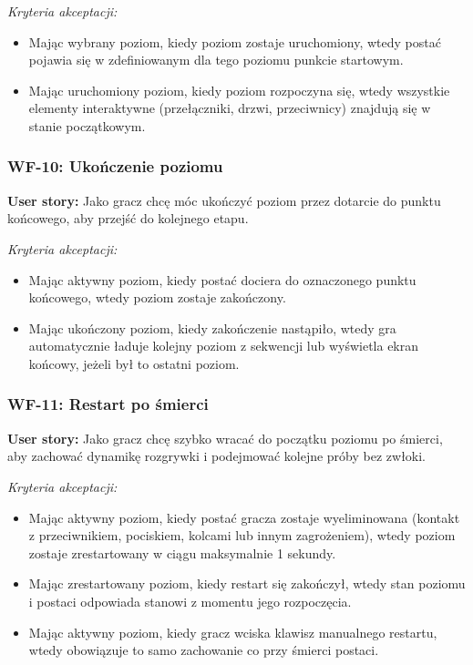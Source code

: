 \textit{Kryteria akceptacji:}
\begin{itemize}[noitemsep]
    \item Mając wybrany poziom, kiedy poziom zostaje uruchomiony, wtedy postać pojawia się w zdefiniowanym dla tego poziomu punkcie startowym.
    \item Mając uruchomiony poziom, kiedy poziom rozpoczyna się, wtedy wszystkie elementy interaktywne (przełączniki, drzwi, przeciwnicy) znajdują się w stanie początkowym.
\end{itemize}

\subsubsection*{WF-10: Ukończenie poziomu}
\textbf{User story:} Jako gracz chcę móc ukończyć poziom przez dotarcie do punktu końcowego, aby przejść do kolejnego etapu.

\textit{Kryteria akceptacji:}
\begin{itemize}[noitemsep]
    \item Mając aktywny poziom, kiedy postać dociera do oznaczonego punktu końcowego, wtedy poziom zostaje zakończony.
    \item Mając ukończony poziom, kiedy zakończenie nastąpiło, wtedy gra automatycznie ładuje kolejny poziom z sekwencji lub wyświetla ekran końcowy, jeżeli był to ostatni poziom.
\end{itemize}

\subsubsection*{WF-11: Restart po śmierci}
\textbf{User story:} Jako gracz chcę szybko wracać do początku poziomu po śmierci, aby zachować dynamikę rozgrywki i podejmować kolejne próby bez zwłoki.

\textit{Kryteria akceptacji:}
\begin{itemize}[noitemsep]
    \item Mając aktywny poziom, kiedy postać gracza zostaje wyeliminowana (kontakt z przeciwnikiem, pociskiem, kolcami lub innym zagrożeniem), wtedy poziom zostaje zrestartowany w ciągu maksymalnie 1 sekundy.
    \item Mając zrestartowany poziom, kiedy restart się zakończył, wtedy stan poziomu i postaci odpowiada stanowi z momentu jego rozpoczęcia.
    \item Mając aktywny poziom, kiedy gracz wciska klawisz manualnego restartu, wtedy obowiązuje to samo zachowanie co przy śmierci postaci.
\end{itemize}

